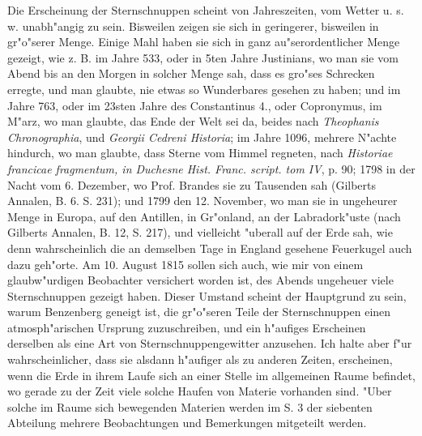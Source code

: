 \documentclass[a4paper, 11pt, oneside, polutonikogreek, german]{article}
\begin{document}
Die Erscheinung der Sternschnuppen scheint von Jahreszeiten, vom Wetter u. s. w. unabh"angig zu sein. Bisweilen zeigen sie sich in geringerer, bisweilen in gr"o"serer Menge. Einige Mahl haben sie sich in ganz au"serordentlicher Menge gezeigt, wie z. B. im Jahre 533, oder in 5ten Jahre Justinians, wo man sie vom Abend bis an den Morgen in solcher Menge sah, dass es gro"ses Schrecken erregte, und man glaubte, nie etwas so Wunderbares gesehen zu haben; und im Jahre 763, oder im 23sten Jahre des Constantinus 4., oder Copronymus, im M"arz, wo man glaubte, das Ende der Welt sei da, beides nach \emph{Theophanis Chronographia}, und \emph{Georgii Cedreni Historia}; im Jahre 1096, mehrere N"achte hindurch, wo man glaubte, dass Sterne vom Himmel regneten, nach \emph{Historiae francicae fragmentum, in Duchesne Hist. Franc. script. tom IV}, p. 90; 1798 in der Nacht vom 6. Dezember, wo Prof. Brandes sie zu Tausenden sah (Gilberts Annalen, B. 6. S. 231); und 1799 den 12. November, wo man sie in ungeheurer Menge in Europa, auf den Antillen, in Gr"onland, an der Labradork"uste (nach Gilberts Annalen, B. 12, S. 217), und vielleicht "uberall auf der Erde sah, wie denn wahrscheinlich die an demselben Tage in England gesehene Feuerkugel auch dazu geh"orte. Am 10. August 1815 sollen sich auch, wie mir von einem glaubw"urdigen Beobachter versichert worden ist, des Abends ungeheuer viele Sternschnuppen gezeigt haben. Dieser Umstand scheint der Hauptgrund zu sein, warum Benzenberg geneigt ist, die gr"o"seren Teile der Sternschnuppen einen atmosph"arischen Ursprung zuzuschreiben, und ein h"aufiges Erscheinen derselben als eine Art von Sternschnuppengewitter anzusehen. Ich halte aber f"ur wahrscheinlicher, dass sie alsdann h"aufiger als zu anderen Zeiten, erscheinen, wenn die Erde in ihrem Laufe sich an einer Stelle im allgemeinen Raume befindet, wo gerade zu der Zeit viele solche Haufen von Materie vorhanden sind. "Uber solche im Raume sich bewegenden Materien werden im S. 3 der siebenten Abteilung mehrere Beobachtungen und Bemerkungen mitgeteilt werden.
\end{document}
